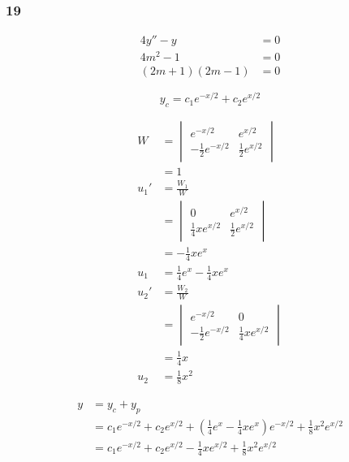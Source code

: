 \documentclass{article}
\begin{document}
\subsubsection{19}

\begin{align*}
  4y'' - y          & = 0 \\
  4m^2 - 1          & = 0 \\
  (2m + 1) (2m - 1) & = 0
\end{align*}

\[y_c = c_1 e^{-x / 2} + c_2 e^{x / 2}\]

\begin{align*}
  W    & = \begin{vmatrix}
             e^{-x / 2}              & e^{x / 2}             \\
             -\frac{1}{2} e^{-x / 2} & \frac{1}{2} e^{x / 2}
           \end{vmatrix}   \\
       & = 1                                                 \\
  u_1' & = \frac{W_1}{W}                                     \\
       & = \begin{vmatrix}
             0                       & e^{x / 2}             \\
             \frac{1}{4} x e^{x / 2} & \frac{1}{2} e^{x / 2}
           \end{vmatrix}   \\
       & = -\frac{1}{4} x e^x                                \\
  u_1  & = \frac{1}{4} e^x - \frac{1}{4} x e^x               \\
  u_2' & = \frac{W_2}{W}                                     \\
       & = \begin{vmatrix}
             e^{-x / 2}              & 0                       \\
             -\frac{1}{2} e^{-x / 2} & \frac{1}{4} x e^{x / 2}
           \end{vmatrix} \\
       & = \frac{1}{4} x                                     \\
  u_2  & = \frac{1}{8} x^2
\end{align*}

\begin{align*}
  y & = y_c + y_p                                                                                                                  \\
    & = c_1 e^{-x / 2} + c_2 e^{x / 2} + \left( \frac{1}{4} e^x - \frac{1}{4} x e^x \right) e^{-x / 2} + \frac{1}{8} x^2 e^{x / 2} \\
    & = c_1 e^{-x / 2} + c_2 e^{x / 2} - \frac{1}{4} x e^{x / 2} + \frac{1}{8} x^2 e^{x / 2}
\end{align*}
\end{document}
